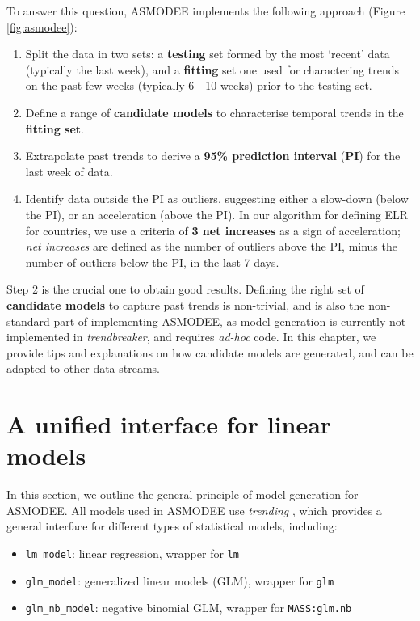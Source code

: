 \documentclass[]{book}
\providecommand{\tightlist}{%
  \setlength{\itemsep}{0pt}\setlength{\parskip}{0pt}}
\begin{document}
To answer this question, ASMODEE implements the following approach (Figure
\ref{fig:asmodee}):

\begin{enumerate}
\def\labelenumi{\arabic{enumi}.}
\item
  Split the data in two sets: a \textbf{testing} set formed by the most `recent'
  data (typically the last week), and a \textbf{fitting} set one used for
  charactering trends on the past few weeks (typically 6 - 10 weeks) prior to
  the testing set.
\item
  Define a range of \textbf{candidate models} to characterise temporal trends in the
  \textbf{fitting set}.
\item
  Extrapolate past trends to derive a \textbf{95\% prediction interval} (\textbf{PI}) for the last
  week of data.
\item
  Identify data outside the PI as outliers, suggesting either a slow-down
  (below the PI), or an acceleration (above the PI). In our algorithm for
  defining ELR for countries, we use a criteria of \textbf{3 net increases} as a
  sign of acceleration; \emph{net increases} are defined as the number of outliers
  above the PI, minus the number of outliers below the PI, in the last 7 days.
\end{enumerate}

Step 2 is the crucial one to obtain good results. Defining the right set of
\textbf{candidate models} to capture past trends is non-trivial, and is also the
non-standard part of implementing ASMODEE, as model-generation is currently not
implemented in \emph{trendbreaker}, and requires \emph{ad-hoc} code. In this chapter, we
provide tips and explanations on how candidate models are generated, and can be
adapted to other data streams.

\hypertarget{a-unified-interface-for-linear-models}{%
\section{A unified interface for linear models}\label{a-unified-interface-for-linear-models}}

In this section, we outline the general principle of model generation for
ASMODEE. All models used in ASMODEE use \emph{trending} \citep{R-trending}, which
provides a general interface for different types of statistical models,
including:

\begin{itemize}
\tightlist
\item
  \texttt{lm\_model}: linear regression, wrapper for \texttt{lm}
\item
  \texttt{glm\_model}: generalized linear models (GLM), wrapper for \texttt{glm}
\item
  \texttt{glm\_nb\_model}: negative binomial GLM, wrapper for \texttt{MASS:glm.nb}
\end{itemize}
\end{document}
